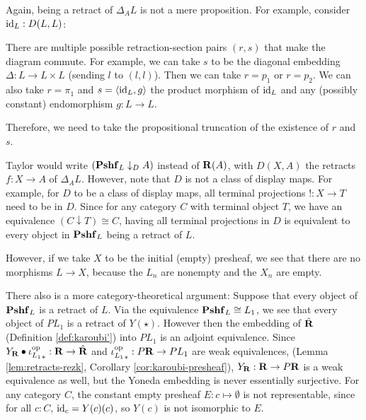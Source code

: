\begin{remark}
  Again, being a retract of $ \Delta_A L $ is not a mere proposition. For example, consider $ \text{id}_{L} : D(L, L) $:
  \begin{center}
  \end{center}
  There are multiple possible retraction-section pairs $ (r, s) $ that make the diagram commute. For example, we can take $ s $ to be the diagonal embedding $ \Delta : L \to L \times L $ (sending $ l $ to $ (l, l) $). Then we can take $ r = p_1 $ or $ r = p_2 $. We can also take $ r = \pi_1 $ and $ s = \langle \text{id}_{L}, g \rangle $ the product morphism of $ \text{id}_{L} $ and any (possibly constant) endomorphism $ g: L \to L $.

  Therefore, we need to take the propositional truncation of the existence of $ r $ and $ s $.
\end{remark}

\begin{remark}
  Taylor would write $ (\mathbf{Pshf}_{L} \downarrow_D A) $ instead of $ \mathbf{R}(A) $, with $ D(X, A) $ the retracts $ f: X \to A $ of $ \Delta_A L $. However, note that $ D $ is not a class of display maps. For example, for $ D $ to be a class of display maps, all terminal projections $ ! : X \to T $ need to be in $ D $. Since for any category $ C $ with terminal object $ T $, we have an equivalence $ (C \downarrow T) \cong C $, having all terminal projections in $ D $ is equivalent to every object in $ \mathbf{Pshf}_{L} $ being a retract of $ L $.

  However, if we take $ X $ to be the initial (empty) presheaf, we see that there are no morphisms $ L \to X $, because the $ L_n $ are nonempty and the $ X_n $ are empty.

  There also is a more category-theoretical argument: Suppose that every object of $ \mathbf{Pshf}_{L} $ is a retract of $ L $. Via the equivalence $ \mathbf{Pshf}_{L} \cong L_1 $, we see that every object of $ P L_1 $ is a retract of $ Y(\star) $. However then the embedding of $ \hat {\mathbf{R}} $ (Definition \ref{def:karoubi'}) into $ P L_1 $ is an adjoint equivalence. Since $ Y_{\mathbf{R}} \bullet {\ensuremath{\iota_{L_1}^{\text{op}}}}_* : \mathbf{R} \to \hat {\mathbf{R}} $ and $ {\iota_{L_1}^{\text{op}}}_* : P \mathbf{R} \to P L_1 $ are weak equivalences, (Lemma \ref{lem:retracts-rezk}, Corollary \ref{cor:karoubi-presheaf}), $ Y_{\mathbf{R}} : \mathbf{R} \to P \mathbf{R} $ is a weak equivalence as well, but the Yoneda embedding is never essentially surjective. For any category $ C $, the constant empty presheaf $ E: c \mapsto \emptyset $ is not representable, since for all $ c : C $, $ \text{id}_{c} = Y(c)(c) $, so $ Y(c) $ is not isomorphic to $ E $.
\end{remark}

